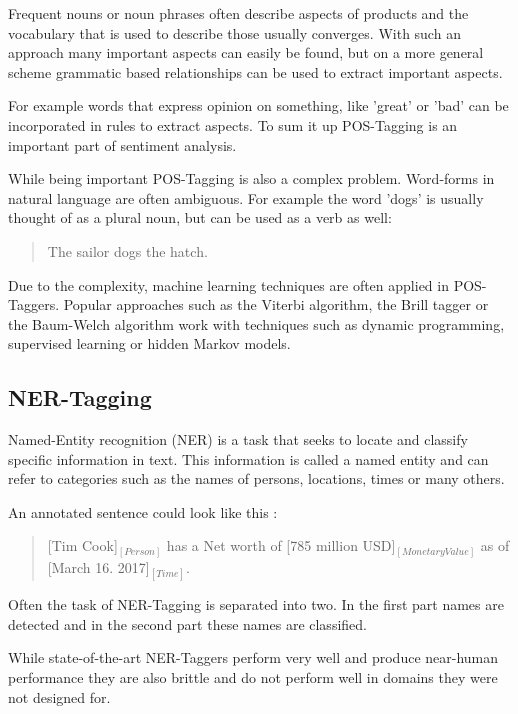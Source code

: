 \documentclass[10pt,a4paper]{article}
\begin{document}
		Frequent nouns or noun phrases often describe aspects of products and the vocabulary that is used to describe those usually converges. With such an approach many important aspects can easily be found, but on a more general scheme grammatic based relationships can be used to extract important aspects.

		For example words that express opinion on something, like 'great' or 'bad' can be incorporated in rules to extract aspects. To sum it up POS-Tagging is an important part of sentiment analysis.
		
		While being important POS-Tagging is also a complex problem. Word-forms in natural language are often ambiguous. For example the word 'dogs' is usually thought of as a plural noun, but can be used as a verb as well:

		\begin{quote}
			The sailor dogs the hatch.
		\end{quote}

		Due to the complexity, machine learning techniques are often applied in POS-Taggers. Popular approaches such as the Viterbi algorithm, the Brill tagger or the Baum-Welch algorithm work with techniques such as dynamic programming, supervised learning or hidden Markov models.
		
		\subsection{NER-Tagging}
		
		Named-Entity recognition (NER) is a task that seeks to locate and classify specific information in text. This information is called a named entity and can refer to categories such as the names of persons, locations, times or many others.

		An annotated sentence could look like this :

		\begin{quote}
			[Tim Cook]$_{[Person]}$ has a Net worth of [785 million USD]$_{[Monetary Value]}$ as of [March 16. 2017]$_{[Time]}$.
		\end{quote}
		
		Often the task of NER-Tagging is separated into two. In the first part names are detected and in the second part these names are classified. 
		
		While state-of-the-art NER-Taggers perform very well and produce near-human performance they are also brittle and do not perform well in domains they were not designed for.
\end{document}
